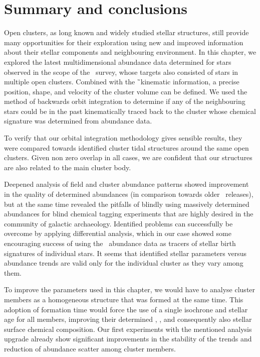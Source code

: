 \section{Summary and conclusions}
\label{sec:clusters_summary_conclusions}
Open clusters, as long known and widely studied stellar structures, still provide many opportunities for their exploration using new and improved information about their stellar components and neighbouring environment. In this chapter, we explored the latest multidimensional abundance data determined for stars observed in the scope of the \Gh\ survey, whose targets also consisted of stars in multiple open clusters. Combined with the \G\ kinematic information, a precise position, shape, and velocity of the cluster volume can be defined. We used the method of backwards orbit integration to determine if any of the neighbouring stars could be in the past kinematically traced back to the cluster whose chemical signature was determined from abundance data.

To verify that our orbital integration methodology gives sensible results, they were compared towards identified cluster tidal structures around the same open clusters. Given non zero overlap in all cases, we are confident that our structures are also related to the main cluster body.

Deepened analysis of field and cluster abundance patterns showed improvement in the quality of determined abundances (in comparison towards older \Gh\ releases), but at the same time revealed the pitfalls of blindly using massively determined abundances for blind chemical tagging experiments that are highly desired in the community of galactic archaeology. Identified problems can successfully be overcome by applying differential analysis, which in our case showed some encouraging success of using the \Gh\ abundance data as tracers of stellar birth signatures of individual stars. It seems that identified stellar parameters versus abundance trends are valid only for the individual cluster as they vary among them.

To improve the parameters used in this chapter, we would have to analyse cluster members as a homogeneous structure that was formed at the same time. This adoption of formation time would force the use of a single isochrone and stellar age for all members, improving their determined \Logg, \Feh, and consequently also stellar surface chemical composition. Our first experiments with the mentioned analysis upgrade already show significant improvements in the stability of the trends and reduction of abundance scatter among cluster members.